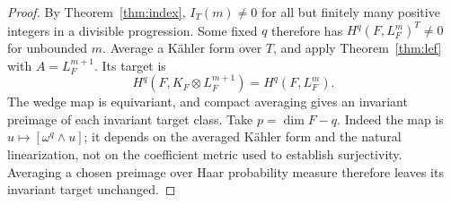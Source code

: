 \begin{proof}
By Theorem~\ref{thm:index}, \(I_T(m)\ne0\) for all but finitely many
positive integers in a divisible progression. Some fixed \(q\)
therefore has \(H^q(F,L_F^m)^T\ne0\) for unbounded \(m\).
Average a Kähler form over \(T\), and apply
Theorem~\ref{thm:lef} with \(A=L_F^{m+1}\). Its target is
\[
H^q(F,K_F\otimes L_F^{m+1})=H^q(F,L_F^m).
\]
The wedge map is equivariant, and compact averaging gives an invariant
preimage of each invariant target class. Take \(p=\dim F-q\).
Indeed the map is \(u\mapsto[\omega^q\wedge u]\); it depends on the
averaged K\"ahler form and the natural linearization, not on the
coefficient metric used to establish surjectivity. Averaging a chosen
preimage over Haar probability measure therefore leaves its invariant
target unchanged.
\end{proof}
